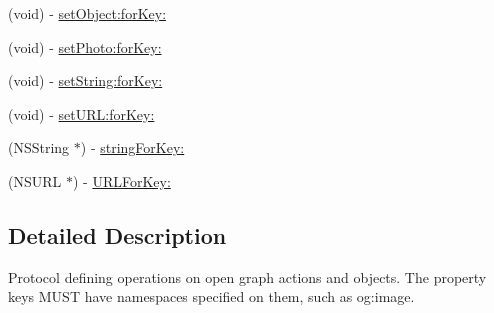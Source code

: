 \begin{DoxyCompactItemize}
\item 
(void) -\/ \hyperlink{protocol_f_b_s_d_k_share_open_graph_value_containing-p_ae39e1fd18cb249dbb5f52a1e02dbff46}{set\-Object\-:for\-Key\-:}
\item 
(void) -\/ \hyperlink{protocol_f_b_s_d_k_share_open_graph_value_containing-p_afed78fe30a2e21d2fe642f736ec5f716}{set\-Photo\-:for\-Key\-:}
\item 
(void) -\/ \hyperlink{protocol_f_b_s_d_k_share_open_graph_value_containing-p_a3086cc4cb361c847da35893101cf3f89}{set\-String\-:for\-Key\-:}
\item 
(void) -\/ \hyperlink{protocol_f_b_s_d_k_share_open_graph_value_containing-p_ad986927ecf2fd3786b1e7732cc5c76a5}{set\-U\-R\-L\-:for\-Key\-:}
\item 
(N\-S\-String $\ast$) -\/ \hyperlink{protocol_f_b_s_d_k_share_open_graph_value_containing-p_a11906a21c6657a4c7028b324918c3e81}{string\-For\-Key\-:}
\item 
(N\-S\-U\-R\-L $\ast$) -\/ \hyperlink{protocol_f_b_s_d_k_share_open_graph_value_containing-p_a21f89dae3641363d84d29100739c044c}{U\-R\-L\-For\-Key\-:}
\end{DoxyCompactItemize}


\subsection{Detailed Description}
Protocol defining operations on open graph actions and objects.  The property keys M\-U\-S\-T have namespaces specified on them, such as {\ttfamily og\-:image}. 

